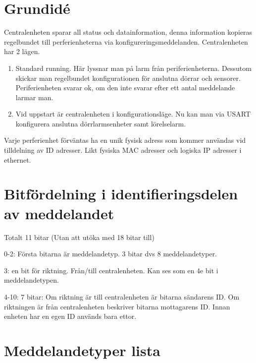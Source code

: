 \documentclass[a4paper]{article}
\begin{document}

\section*{Grundidé}
\label{sec:grundide}

Centralenheten sparar all status och datainformation, denna information kopieras regelbundet till perferienheterna via konfigureringsmeddelanden. Centralenheten har 2 lägen.

\begin{enumerate}
	\item Standard running. Här lyssnar man på larm från periferienheterna. Dessutom skickar man regelbundet  konfigurationen för anslutna dörrar och sensorer. Periferienheten svarar ok, om den inte svarar efter ett antal meddelande larmar man.
	\item Vid uppstart är centralenheten i konfigurationsläge. Nu kan man via USART konfigurera anslutna dörrlarmsenheter samt lörelselarm.
\end{enumerate}

Varje perferienhet förväntas ha en unik fysisk adress som kommer användas vid tilldelning av ID adresser. Likt fysiska MAC adresser och logiska IP adresser i ethernet.

\section*{Bitfördelning i identifieringsdelen av meddelandet}
\label{sec:bitfördelning}

Totalt 11 bitar (Utan att utöka med 18 bitar till)
\begin{description}
	\item{0-2:} Första bitarna är meddelandetyp. 3 bitar dvs 8 meddelandetyper.
	\item{3:} en bit för riktning. Från/till centralenheten. Kan ses som en 4e bit i meddelandetypen.
	\item{4-10:} 7 bitar:
		Om riktning är till centralenheten är bitarna sändarens ID.
		Om riktningen är från centralenheten beskriver bitarna mottagarens ID.
		Innan enheten har en egen ID används bara ettor.
\end{description}


\section*{Meddelandetyper lista}
\label{sec:meddelandetyper}
\end{document}

